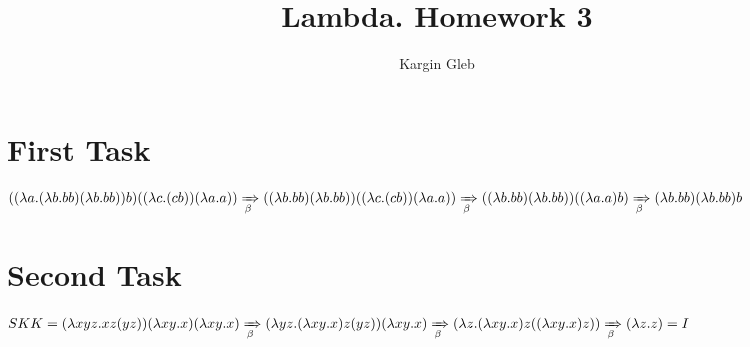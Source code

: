 \documentclass{article}
\title{Lambda. Homework 3}
\author{Kargin Gleb}
\date{}
\begin{document}
    \maketitle


    \section{First Task}
    $
    ((\lambda a.(\lambda b.b b) (\lambda b.b b)) b) ((\lambda c.(c b)) (\lambda a.a)) \xRightarrow[\beta]{} ((\lambda b.b b) (\lambda b.b b)) ((\lambda c.(c b)) (\lambda a.a)) \xRightarrow[\beta]{} ((\lambda b.b b) (\lambda b.b b)) ((\lambda a.a) b) \xRightarrow[\beta]{} (\lambda b.b b) (\lambda b.b b) b
    $


    \section{Second Task}
    \sloppy
    $
    S K K = (\lambda x y z.x z (y z)) (\lambda x y.x) (\lambda x y.x) \xRightarrow[\beta]{} (\lambda y z.(\lambda x y.x) z (y z)) (\lambda x y.x) \xRightarrow[\beta]{} (\lambda z. (\lambda x y.x) z ((\lambda x y.x)z)) \xRightarrow[\beta]{} (\lambda z. z) = I
    $
\end{document}
